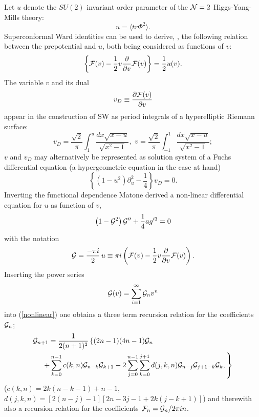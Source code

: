 \documentclass[a4paper,12pt]{article}
\begin{document}
Let $u$ denote the $SU(2)$ invariant order parameter of the 
${\cal N}=2$ Higgs-Yang-Mills theory:
\[
u=\langle tr \Phi^2\rangle.
\]
Superconformal Ward identities can be used to derive, \cite{howe}, 
the following 
relation between the prepotential and $u$, both being considered as 
functions of $v$:
\[
\left\{{\cal F}(v)-\frac{1}{2}v\frac{\partial}{\partial v}{\cal F}(v)
\right\}=\frac{1}{2}u(v).
\]
The variable $v$ and its dual 
\[
v_D\equiv \frac{\partial {\cal F}(v)}{\partial v}
\]
appear in the construction of SW as period integrals of a 
hyperelliptic Riemann surface:
\[
v_D=\frac{\sqrt{2}}{\pi}\int_1^u \frac{dx\sqrt{x-u}}{\sqrt{x^2-1}},
\,\, v=\frac{\sqrt{2}}{\pi}\int_{-1}^1 \frac{dx\sqrt{x-u}}{\sqrt{x^2-1}};
\]
$v$ and $v_D$ may alternatively be represented as solution system of a 
Fuchs differential equation (a hypergeometric equation in the case at 
hand)
\begin{equation}
\left\{
\left(1-u^2\right)\partial_u^2-\frac{1}{4}
\right\}v_D=0.
\label{fuchs}
\end{equation}
Inverting the functional dependence Matone \cite{matone3} derived  
a non-linear differential equation for $u$ as function of $v$,
\begin{equation}
\left(1-{\cal G}^2\right){\cal G}''+\frac{1}{4}ag'^3=0
\label{nonlinear}
\end{equation}
with the notation \[
{\cal G}=\frac{-\pi i }{2} \, u\equiv \pi i \left({\cal F}(v)-\frac{1}{2}v 
\frac{\partial}{\partial v} {\cal F}(v)
\right).
\]
Inserting the power series 
\[
{\cal G}(v)=\sum_{i=1}^{\infty} {\cal G}_n v^n
\]
into (\ref{nonlinear}) one obtains a three term recursion relation 
for the coefficients ${\cal G}_n$;
\begin{eqnarray}
{\cal G}_{n+1}=\frac{1}{2(n+1)^2}\left\{(2n-1)(4n-1){\cal G}_n \right. 
\qquad \qquad \qquad \qquad \qquad \quad \nonumber \\ 
\left. +\sum_{k=0}^{n-1}c(k,n){\cal G}_{n-k}{\cal G}_{k+1}-2\sum_{j=0}^{n-1}
\sum_{k=0}^{j+1}d(j,k,n) {\cal G}_{n-j}{\cal G}_{j+1-k}{\cal G}_k,
\right\}
\label{recursion}
\end{eqnarray}
($c(k,n)=2k(n-k-1)+n-1$, \, \, $d(j,k,n)=[2(n-j)-1][2n-3j-1+2k(j-k+1)]$) 
and therewith also a recursion relation for the coefficients 
${\cal F}_n= {\cal G}_n /2\pi in$. 
\end{document}
